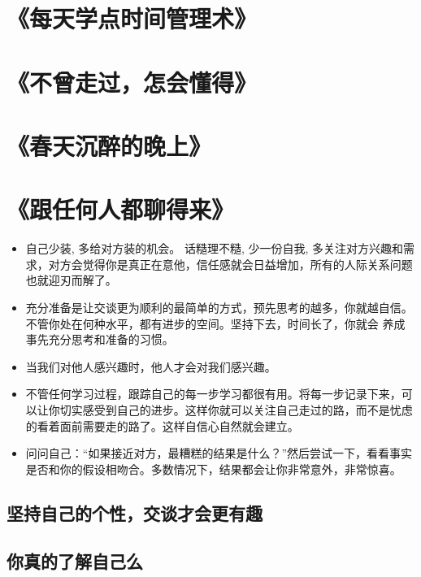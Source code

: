 \documentclass[UTF8,a4paper,8pt]{ctexbook}
\begin{document}
		
	\newpage
	\section{《每天学点时间管理术》 }
	
	\newpage
	\section{《不曾走过，怎会懂得》 }
	
	\newpage
	\section{《春天沉醉的晚上》 }
	
	\newpage
	\section{《跟任何人都聊得来》 }
		\begin{itemize}
			\item 自己少装, 多给对方装的机会。 话糙理不糙, 少一份自我, 多关注对方兴趣和需求，对方会觉得你是真正在意他，信任感就会日益增加，所有的人际关系问题也就迎刃而解了。
			
			\item 充分准备是让交谈更为顺利的最简单的方式，预先思考的越多，你就越自信。不管你处在何种水平，都有进步的空间。坚持下去，时间长了，你就会 养成事先充分思考和准备的习惯。
			
			\item 当我们对他人感兴趣时，他人才会对我们感兴趣。
			
			\item 不管任何学习过程，跟踪自己的每一步学习都很有用。将每一步记录下来，可以让你切实感受到自己的进步。这样你就可以关注自己走过的路，而不是忧虑的看着面前需要走的路了。这样自信心自然就会建立。
			
			\item 问问自己：“如果接近对方，最糟糕的结果是什么？”然后尝试一下，看看事实是否和你的假设相吻合。多数情况下，结果都会让你非常意外，非常惊喜。
		\end{itemize}
		
		
		\subsection{坚持自己的个性，交谈才会更有趣}
		
		\subsection{你真的了解自己么}
		
\end{document}
